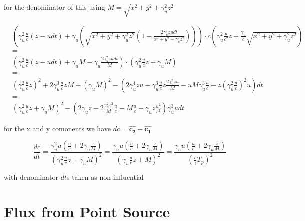 for the denominator of this using $M = \sqrt{x^2 + y^2 + \gamma_u^2 z^2} $

\begin{equation}
	\begin{aligned}
		& \left( \gamma_u^2 \frac{u}{c} (z - u dt) + \gamma_u \left( \sqrt{x^2 + y^2 + \gamma_u^2 z^2} (1 - \frac{2\gamma_u^2 z u dt}{x^2 + y^2 + \gamma_u^2 z^2})  \right) \right) \cdot c \left( \gamma_u^2 \frac{u}{c^2}z + \frac{\gamma_u}{c} \sqrt{x^2 + y^2 + \gamma_u^2 z^2} \right) \\
		&=
		\\
		&\left( \gamma_u^2 \frac{u}{c} (z - u dt) + \gamma_u M - \gamma_u \frac{2\gamma_u^2 z u dt}{M} \right) \cdot  \left( \gamma_u^2 \frac{u}{c}z + \gamma_u M \right) \\
		&=\\
		&  \left( \gamma_u^2 \frac{u}{c} z \right)^2  + 2 \gamma_u^3 \frac{u}{c}z M  +  (\gamma_u M)^2 - \left( 2\gamma_u^4 z u  - \gamma_u^3 \frac{u}{c}z \frac{2\gamma_u^2 z u }{M}  - u    M \gamma_u^3 \frac{u}{c} - z \left( \gamma_u^2 \frac{u}{c} \right)^2 u  \right) dt \\
		&=\\
		&  \left( \gamma_u^2 \frac{u}{c} z + \gamma_u M \right)^2  - \left( 2\gamma_u z   - 2  \frac{ \gamma_u^2 z^2 }{M} \frac{u}{c}  -  M  \frac{u}{c} - \gamma_u z  \frac{u^2}{c^2}   \right)  \gamma_u^3 u dt
	\end{aligned}
\end{equation}


for the x and y comonents we have $ dc = \mathbf{\hat{c_2}} - \mathbf{\hat{c_1}} $

\begin{equation}
	\frac{dc}{dt} = \frac{    \gamma_u^2  u \left ( \frac{u}{c}  + 2\gamma_u  \frac{ z }{M}   \right ) }{ \left( \gamma_u^2 \frac{u}{c} z + \gamma_u M \right)^2 }
	=
	\frac{ \gamma_u  u \left ( \frac{u}{c}  + 2 \gamma_u  \frac{ z }{M}   \right ) }{ \left( \gamma_u \frac{u}{c} z +  M \right)^2 }
	=
	\frac{ \gamma_u  u \left ( \frac{u}{c}  + 2 \gamma_u  \frac{ z }{M}   \right ) }{ \left( \frac{c}{\gamma} T_p \right)^2 }
\end{equation}

with denominator $dt$s taken as non influential



\section{Flux from Point Source} \label{sect: Flux from Point Source}

